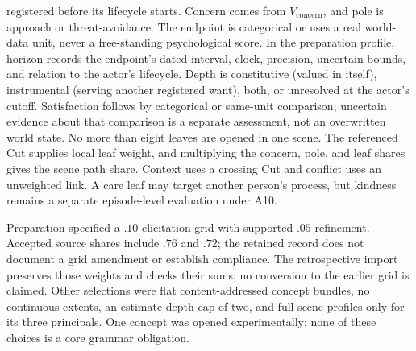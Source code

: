 \documentclass[11pt,a4paper]{article}
\begin{document}
\begin{description}[style=nextline]
    registered before its lifecycle starts. Concern comes from
    $V_{\mathrm{concern}}$, and pole is approach or threat-avoidance. The
    endpoint is categorical or uses a real world-data unit, never a free-standing
    psychological score. In the preparation profile, horizon records the
    endpoint's dated interval, clock, precision, uncertain bounds, and relation
    to the actor's lifecycle. Depth is constitutive (valued in itself),
    instrumental (serving another registered want), both, or unresolved at the
    actor's cutoff. Satisfaction follows by categorical or same-unit
    comparison; uncertain evidence about that comparison is a separate
    assessment, not an overwritten world state. No more than eight leaves are
    opened in one scene. The referenced Cut
    supplies local leaf weight, and multiplying the concern, pole, and leaf
    shares gives the scene path share. Context uses a crossing Cut and conflict
    uses an unweighted link. A care leaf may target another person's process,
    but kindness remains a separate episode-level evaluation under A10.
  \item[Completed Book selections.] Preparation specified a $.10$ elicitation
    grid with supported $.05$ refinement. Accepted source shares include $.76$
    and $.72$; the retained record does not document a grid amendment or
    establish compliance. The retrospective import preserves those weights and
    checks their sums; no conversion to the earlier grid is claimed. Other
    selections were flat content-addressed concept bundles, no continuous
    extents, an estimate-depth cap of two, and full scene profiles only for its
    three principals. One concept was opened experimentally; none of these
    choices is a core grammar obligation.
\end{description}
\end{document}
